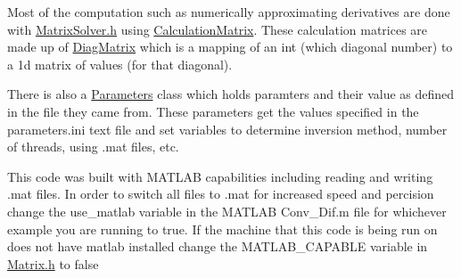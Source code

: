 Most of the computation such as numerically approximating derivatives are done with \hyperlink{_matrix_solver_8h}{Matrix\+Solver.\+h} using \hyperlink{class_calculation_matrix}{Calculation\+Matrix}. These calculation matrices are made up of \hyperlink{class_diag_matrix}{Diag\+Matrix} which is a mapping of an int (which diagonal number) to a 1d matrix of values (for that diagonal).

There is also a \hyperlink{class_parameters}{Parameters} class which holds paramters and their value as defined in the file they came from. These parameters get the values specified in the parameters.\+ini text file and set variables to determine inversion method, number of threads, using .mat files, etc.

This code was built with M\+A\+T\+L\+A\+B capabilities including reading and writing .mat files. In order to switch all files to .mat for increased speed and percision change the use\+\_\+matlab variable in the M\+A\+T\+L\+A\+B Conv\+\_\+\+Dif.\+m file for whichever example you are running to true. If the machine that this code is being run on does not have matlab installed change the M\+A\+T\+L\+A\+B\+\_\+\+C\+A\+P\+A\+B\+L\+E variable in \hyperlink{_matrix_8h}{Matrix.\+h} to false 